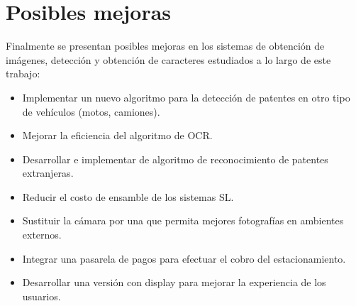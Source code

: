 \section{Posibles mejoras}
Finalmente se presentan posibles mejoras en los sistemas de obtención de imágenes, detección y obtención de caracteres estudiados a lo largo de este trabajo:
\begin{itemize}
    \item Implementar un nuevo algoritmo para la detección de patentes en otro tipo de vehículos (motos, camiones).
    \item Mejorar la eficiencia del algoritmo de OCR.
    \item Desarrollar e implementar de algoritmo de reconocimiento de patentes extranjeras.
    \item Reducir el costo de ensamble de los sistemas SL.
    \item Sustituir la cámara por una que permita mejores fotografías en ambientes externos.
    \item Integrar una pasarela de pagos para efectuar el cobro del estacionamiento.
    \item Desarrollar una versión con display para mejorar la experiencia de los usuarios.
\end{itemize}
